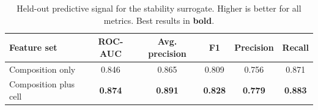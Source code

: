 \begin{table}[t]
    \centering
    \caption{Held-out predictive signal for the stability surrogate. Higher is better for all metrics. Best results in {\bf bold}.}
    \label{tab:predictive_signal}
    \begin{tabular}{@{}lccccc@{}}
        \toprule
        Feature set & ROC-AUC & Avg. precision & F1 & Precision & Recall \\
        \midrule
        Composition only & 0.846 & 0.865 & 0.809 & 0.756 & 0.871 \\
        Composition plus cell & {\bf 0.874} & {\bf 0.891} & {\bf 0.828} & {\bf 0.779} & {\bf 0.883} \\
        \bottomrule
    \end{tabular}
\end{table}
